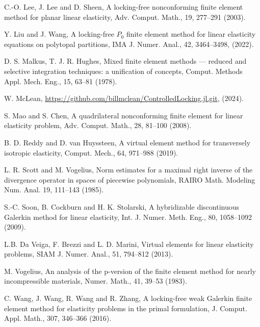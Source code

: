 \documentclass[11pt]{article}
\numberwithin{equation}{section}
\begin{document}
\begin{thebibliography}{99.}
 C.-O. Lee, J. Lee and  D. Sheen, A locking-free nonconforming finite element method for planar linear elasticity, Adv. Comput. Math., 19, 277--291 (2003).

 Y. Liu and  J. Wang, A locking-free $P_0$ finite element method for linear elasticity equations on polytopal partitions, IMA J. Numer. Anal., 42, 3464--3498, (2022).

 D. S. Malkus, T. J. R. Hughes, Mixed finite element methods — reduced and selective integration techniques: a unification of concepts, Comput. Methods Appl. Mech. Eng., 15, 63--81 (1978).

 W. McLean,  \url{https://github.com/billmclean/ControlledLocking.jl.git}, (2024).

 S. Mao and  S. Chen, A quadrilateral nonconforming finite element for linear elasticity problem, Adv. Comput. Math., 28, 81--100 (2008).

 B. D. Reddy and  D. van Huyssteen, A virtual element method for transversely isotropic elasticity, Comput. Mech., 64, 971--988 (2019).

 L. R. Scott and M. Vogelius, Norm estimates for a maximal right inverse of the divergence operator in spaces of piecewise polynomials, RAIRO Math. Modeling Num. Anal. 19, 111--143 (1985).

 S.-C. Soon, B. Cockburn and H. K. Stolarski, A hybridizable discontinuous Galerkin method for linear elasticity, Int. J. Numer. Meth.  Eng., 80, 1058--1092 (2009).


 L.B. Da Veiga, F. Brezzi and  L. D. Marini, Virtual elements for linear elasticity problems, SIAM J. Numer. Anal., 51, 794--812 (2013).

 M. Vogelius, An analysis of the p-version of the finite element method for nearly incompressible materials, Numer. Math., 41, 39--53 (1983).

 C. Wang, J. Wang, R. Wang and  R. Zhang, A locking-free weak Galerkin finite element method for elasticity problems in the primal formulation, J. Comput. Appl. Math., 307, 346--366 (2016).


\end{thebibliography}
\end{document}
